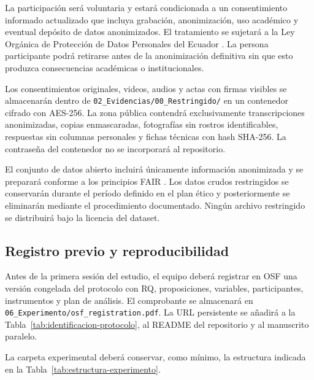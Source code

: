 \documentclass[12pt,a4paper]{article}
\begin{document}
La participación será voluntaria y estará condicionada a un consentimiento informado actualizado que incluya grabación, anonimización, uso académico y eventual depósito de datos anonimizados. El tratamiento se sujetará a la Ley Orgánica de Protección de Datos Personales del Ecuador \cite{lopdp2021}. La persona participante podrá retirarse antes de la anonimización definitiva sin que esto produzca consecuencias académicas o institucionales.

Los consentimientos originales, videos, audios y actas con firmas visibles se almacenarán dentro de \nolinkurl{02_Evidencias/00_Restringido/} en un contenedor cifrado con AES-256. La zona pública contendrá exclusivamente transcripciones anonimizadas, copias enmascaradas, fotografías sin rostros identificables, respuestas sin columnas personales y fichas técnicas con hash SHA-256. La contraseña del contenedor no se incorporará al repositorio.

El conjunto de datos abierto incluirá únicamente información anonimizada y se preparará conforme a los principios FAIR \cite{wilkinson2016}. Los datos crudos restringidos se conservarán durante el período definido en el plan ético y posteriormente se eliminarán mediante el procedimiento documentado. Ningún archivo restringido se distribuirá bajo la licencia del dataset.

\subsection{Registro previo y reproducibilidad}

Antes de la primera sesión del estudio, el equipo deberá registrar en OSF una versión congelada del protocolo con RQ, proposiciones, variables, participantes, instrumentos y plan de análisis. El comprobante se almacenará en \nolinkurl{06_Experimento/osf_registration.pdf}. La URL persistente se añadirá a la Tabla~\ref{tab:identificacion-protocolo}, al README del repositorio y al manuscrito paralelo.

La carpeta experimental deberá conservar, como mínimo, la estructura indicada en la Tabla~\ref{tab:estructura-experimento}.
\end{document}
